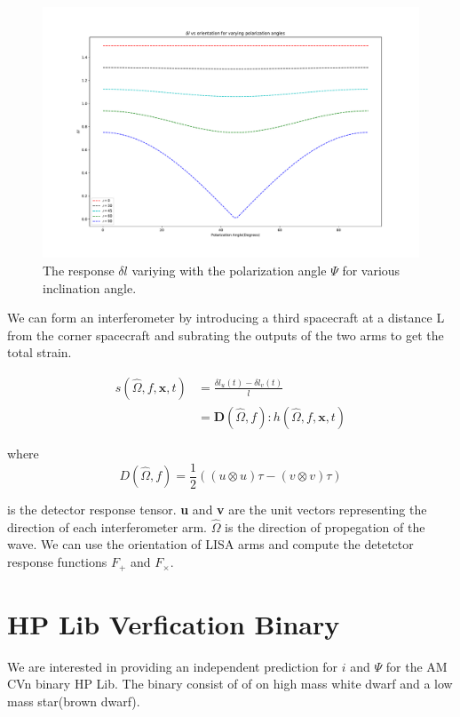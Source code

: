 \documentclass[10pt,a4paper]{article}
\begin{document}
\begin{figure}[!h]
\centering
\includegraphics[scale=0.3]{../Figures/responsevsorientationofbinary.pdf}
\caption{The response $\delta l$ variying with the polarization angle $\Psi$ for various inclination angle.}
\end{figure}


We can form an interferometer by introducing a third spacecraft at a distance L from the corner spacecraft and subrating the outputs of the two arms \cite{cornish} to get the total strain.


\begin{align}
s(\hat{\Omega},f,\textbf{x},t)&=\frac{\delta l_u (t) - \delta l_v (t)}{l}\\
&=\textbf{D}(\hat{\Omega},f) : h(\hat{\Omega},f,\textbf{x},t)
\end{align}

where $$D(\hat{\Omega},f) = \frac{1}{2}\left((u \otimes u) \tau - (v \otimes v) \tau \right)$$

is the detector response tensor. \textbf{u} and \textbf{v} are the unit vectors representing the direction of each interferometer arm. $\hat{\Omega}$ is the direction of propegation of the wave. We can use the orientation of LISA arms and compute the detetctor response functions $F_{+}$ and $F_{\times}$.


\section*{HP Lib Verfication Binary}

We are interested in providing an independent prediction for $i$ and $\Psi$ for the AM CVn binary HP Lib. The binary consist of of on high mass white dwarf and a low mass star(brown dwarf).\\
\end{document}
